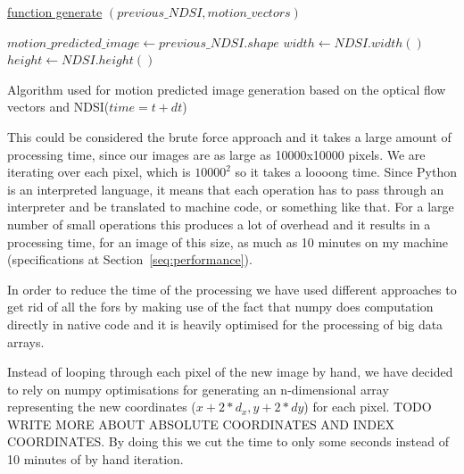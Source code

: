 \documentclass[11pt, a4paper]{report}
\begin{document}
	\begin{algorithm}
			
			\underline{function generate} $(previous\_NDSI, motion\_vectors)$\;
			
			$motion\_predicted\_image \gets previous\_NDSI.shape$\;
			$width \gets NDSI.width()$\;
			$height \gets NDSI.height()$\;
			
			\;

			\caption{Algorithm used for motion predicted image generation based on the optical flow vectors and NDSI(\(time=t+dt\))}
			\label{algo:change}
	\end{algorithm}
	
	This could be considered the brute force approach and it takes a large amount of processing time, since our images are as large as 10000x10000 pixels. We are iterating over each pixel, which is $10000^2$ so it takes a loooong time. Since Python is an interpreted language, it means that each operation has to pass through an interpreter and be translated to machine code, or something like that. For a large number of small operations this produces a lot of overhead and it results in a processing time, for an image of this size, as much as 10 minutes on my machine (specifications at Section~\ref{seq:performance}).
	
	In order to reduce the time of the processing we have used different approaches to get rid of all the fors by making use of the fact that numpy does computation directly in native code and it is heavily optimised for the processing of big data arrays.
	
	Instead of looping through each pixel of the new image by hand, we have decided to rely on numpy optimisations for generating an n-dimensional array representing the new coordinates (\(x + 2*d_x, y + 2*dy\)) for each pixel. TODO WRITE MORE ABOUT ABSOLUTE COORDINATES AND INDEX COORDINATES. By doing this we cut the time to only some seconds instead of 10 minutes of by hand iteration.
	
\end{document}
